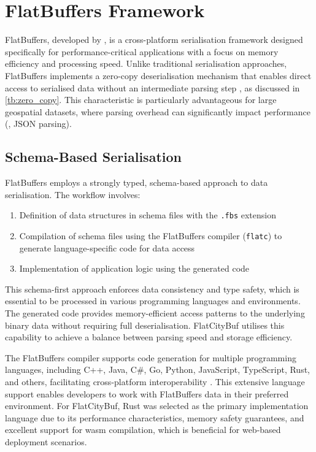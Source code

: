 
\section{FlatBuffers Framework}
\label{tb:flatbuffers}

FlatBuffers, developed by \citet{flatbuffers}, is a cross-platform serialisation framework designed specifically for performance-critical applications with a focus on memory efficiency and processing speed. Unlike traditional serialisation approaches, FlatBuffers implements a zero-copy deserialisation mechanism that enables direct access to serialised data without an intermediate parsing step \citep{flatbuffers_benchmark}, as discussed in \autoref{tb:zero_copy}.
This characteristic is particularly advantageous for large geospatial datasets, where parsing overhead can significantly impact performance (\eg, JSON parsing).

\subsection{Schema-Based Serialisation}
\label{tb:flatbuffers:schema_based_serialisation}

FlatBuffers employs a strongly typed, schema-based approach to data serialisation. The workflow involves:

\begin{enumerate}
  \item Definition of data structures in schema files with the \texttt{.fbs} extension
  \item Compilation of schema files using the FlatBuffers compiler (\texttt{flatc}) to generate language-specific code for data access
  \item Implementation of application logic using the generated code
\end{enumerate}

This schema-first approach enforces data consistency and type safety, which is essential to be processed in various programming languages and environments. The generated code provides memory-efficient access patterns to the underlying binary data without requiring full deserialisation. FlatCityBuf utilises this capability to achieve a balance between parsing speed and storage efficiency.

The FlatBuffers compiler supports code generation for multiple programming languages, including C++, Java, C\#, Go, Python, JavaScript, TypeScript, Rust, and others, facilitating cross-platform interoperability \citep{flatbuffers_support}. This extensive language support enables developers to work with FlatBuffers data in their preferred environment. For FlatCityBuf, Rust was selected as the primary implementation language due to its performance characteristics, memory safety guarantees, and excellent support for \ac{wasm} compilation, which is beneficial for web-based deployment scenarios.

